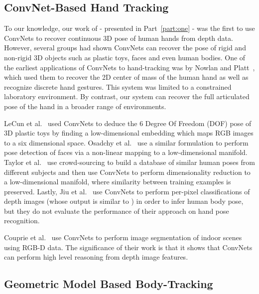 \subsection*{ConvNet-Based Hand Tracking}

To our knowledge, our work of \cite{tompsonTOG14} - presented in Part~\ref{part:one} - was the first to use ConvNets to recover continuous 3D pose of human hands from depth data. However, several groups had shown ConvNets can recover the pose of rigid and non-rigid 3D objects such as plastic toys, faces and even human bodies. One of the earliest applications of ConvNets to hand-tracking was by Nowlan and Platt~\cite{nowlan}, which used them to recover the 2D center of mass of the human hand as well as recognize discrete hand gestures. This system was limited to a constrained laboratory environment. By contrast, our system can recover the full articulated pose of the hand in a broader range of environments.

LeCun et al.~\cite{lecun_toys} used ConvNets to deduce the 6 Degree Of Freedom (DOF) pose of 3D plastic toys by finding a low-dimensional embedding which maps RGB images to a six dimensional space. Osadchy et al.~\cite{lecun_face} use a similar formulation to perform pose detection of faces via a non-linear mapping to a low-dimensional manifold. Taylor et al.~\cite{TaylorSBF11} use crowd-sourcing to build a database of similar human poses from different subjects and then use ConvNets to perform dimensionality reduction to a low-dimensional manifold, where similarity between training examples is preserved. Lastly, Jiu et al.~\cite{Liris6327} use ConvNets to perform per-pixel classifications of depth images (whose output is similar to \cite{shotton2013real}) in order to infer human body pose, but they do not evaluate the performance of their approach on hand pose recognition.

Couprie et al.~\cite{couprie2013indoor} use ConvNets to perform image segmentation of indoor scenes using RGB-D data. The significance of their work is that it shows that ConvNets can perform high level reasoning from depth image features.

\subsection*{Geometric Model Based Body-Tracking}


